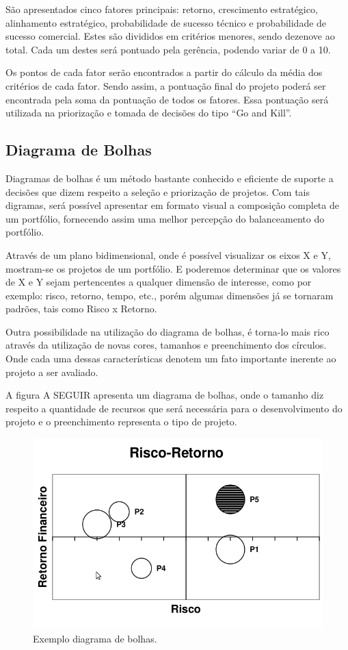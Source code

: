 \documentclass[12pt,a4paper,ruledheader,tocpage=prefix,floatnumber=continuous,pagestart=folhaderosto,font=times]{abnt}
\begin{document}
São apresentados cinco fatores principais: retorno, crescimento estratégico, alinhamento estratégico, probabilidade de sucesso técnico e probabilidade de
sucesso comercial. Estes são divididos em critérios menores, sendo dezenove ao total. Cada um destes será pontuado pela gerência, podendo variar de 0 a 10.

Os pontos de cada fator serão encontrados a partir do cálculo da média dos critérios de cada fator. Sendo assim, a pontuação final do projeto poderá ser 
encontrada pela soma da pontuação de todos os fatores. Essa pontuação será utilizada na priorização e tomada de decisões do tipo ``Go and Kill''.

\subsection{Diagrama de Bolhas}
Diagramas de bolhas é um método bastante conhecido e eficiente de suporte a decisões que dizem respeito a seleção e priorização de projetos. Com tais
digramas, será possível apresentar em formato visual a composição completa de um portfólio, fornecendo assim uma melhor percepção do balanceamento do
portfólio. \cite{cooper2}

Através de um plano bidimensional, onde é possível visualizar os eixos X e Y, mostram-se os projetos de um portfólio. E poderemos determinar que os 
valores de X e Y sejam pertencentes a qualquer dimensão de interesse, como por exemplo: risco, retorno, tempo, etc., porém algumas dimensões já se 
tornaram padrões, tais como Risco x Retorno.\cite{cooper}

Outra possibilidade na utilização do diagrama de bolhas, é torna-lo mais rico através da utilização de novas cores, tamanhos e preenchimento dos círculos.
Onde cada uma dessas características denotem um fato importante inerente ao projeto a ser avaliado.

A figura A SEGUIR apresenta um diagrama de bolhas, onde o tamanho diz respeito a quantidade de recursos que será necessária para o desenvolvimento do projeto
e o preenchimento representa o tipo de projeto.

\begin{figure}[H]
\centering
\includegraphics[width=.9\textwidth]{diagrama_bolhas.png}
\caption{Exemplo diagrama de bolhas\cite{cooper}.}
\end{figure} 
\end{document}
